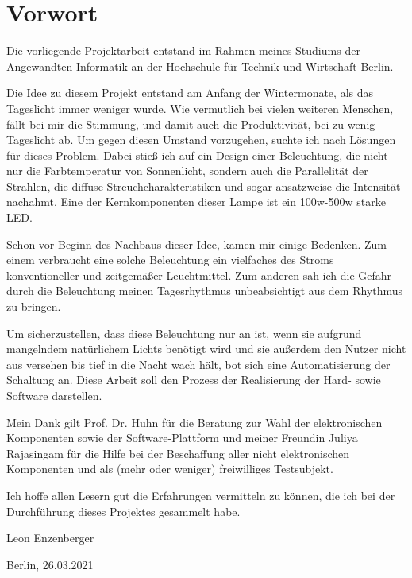 \chapter*{Vorwort}

Die vorliegende Projektarbeit entstand im Rahmen meines Studiums der Angewandten Informatik an der Hochschule für Technik und Wirtschaft Berlin.

Die Idee zu diesem Projekt entstand am Anfang der Wintermonate, als das Tageslicht immer weniger wurde. Wie vermutlich bei vielen weiteren Menschen, fällt bei mir die Stimmung, und damit auch die Produktivität, bei zu wenig Tageslicht ab. Um gegen diesen Umstand vorzugehen, suchte ich nach Lösungen für dieses Problem. Dabei stieß ich auf ein Design einer Beleuchtung, die nicht nur die Farbtemperatur von Sonnenlicht, sondern auch die Parallelität der Strahlen, die diffuse Streuchcharakteristiken und sogar ansatzweise die Intensität nachahmt. Eine der Kernkomponenten dieser Lampe ist ein 100w-500w starke LED.

Schon vor Beginn des Nachbaus dieser Idee, kamen mir einige Bedenken. Zum einem verbraucht eine solche Beleuchtung ein vielfaches des Stroms konventioneller und zeitgemäßer Leuchtmittel. Zum anderen sah ich die Gefahr durch die Beleuchtung meinen Tagesrhythmus unbeabsichtigt aus dem Rhythmus zu bringen.

Um sicherzustellen, dass diese Beleuchtung nur an ist, wenn sie aufgrund mangelndem natürlichem Lichts benötigt wird und sie außerdem den Nutzer nicht aus versehen bis tief in die Nacht wach hält, bot sich eine Automatisierung der Schaltung an. Diese Arbeit soll den Prozess der Realisierung der Hard- sowie Software darstellen.

Mein Dank gilt Prof. Dr. Huhn für die Beratung zur Wahl der elektronischen Komponenten sowie der Software-Plattform und meiner Freundin Juliya Rajasingam für die Hilfe bei der Beschaffung aller nicht elektronischen Komponenten und als (mehr oder weniger) freiwilliges Testsubjekt.

Ich hoffe allen Lesern gut die Erfahrungen vermitteln zu können, die ich bei der Durchführung dieses Projektes gesammelt habe.


Leon Enzenberger

Berlin, 26.03.2021

